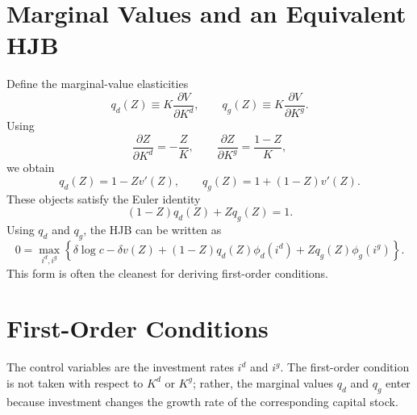 \documentclass[11pt]{article}
\begin{document}
\section{Marginal Values and an Equivalent HJB}

Define the marginal-value elasticities
\begin{equation}
    q_d(Z)
    \equiv
    K\frac{\partial V}{\partial K^d},
    \qquad
    q_g(Z)
    \equiv
    K\frac{\partial V}{\partial K^g}.
\end{equation}
Using
\begin{equation}
    \frac{\partial Z}{\partial K^d}=-\frac{Z}{K},
    \qquad
    \frac{\partial Z}{\partial K^g}=\frac{1-Z}{K},
\end{equation}
we obtain
\begin{equation}
    \boxed{
    q_d(Z)=1-Zv'(Z),
    \qquad
    q_g(Z)=1+(1-Z)v'(Z).
    }
\end{equation}
These objects satisfy the Euler identity
\begin{equation}
    \boxed{
    (1-Z)q_d(Z)+Zq_g(Z)=1.
    }
\end{equation}
Using $q_d$ and $q_g$, the HJB can be written as
\begin{equation}
    \boxed{
    0
    =
    \max_{i^d,i^g}
    \left\{
    \delta\log c
    -\delta v(Z)
    +(1-Z)q_d(Z)\phi_d(i^d)
    +Zq_g(Z)\phi_g(i^g)
    \right\}.
    }
\end{equation}
This form is often the cleanest for deriving first-order conditions.

\section{First-Order Conditions}

The control variables are the investment rates $i^d$ and $i^g$. The first-order condition is not taken with respect to $K^d$ or $K^g$; rather, the marginal values $q_d$ and $q_g$ enter because investment changes the growth rate of the corresponding capital stock.
\end{document}
